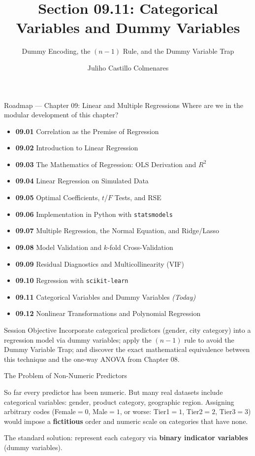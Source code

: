 \documentclass[10pt, aspectratio=169]{beamer}
\title[Categorical Variables]{Section 09.11: Categorical Variables and Dummy Variables}
\subtitle{Dummy Encoding, the $(n-1)$ Rule, and the Dummy Variable Trap}
\author[J. Castillo Colmenares]{Juliho Castillo Colmenares}
\institute{Tecnológico de Monterrey}
\date{\vspace{-1.5cm}}
\begin{document}
\begin{frame}[plain]
  \titlepage
\end{frame}

\begin{frame}{Roadmap --- Chapter 09: Linear and Multiple Regressions}
  \scriptsize
  Where are we in the modular development of this chapter?
  \begin{itemize}\itemsep=0.02em
    \item \textbf{09.01} Correlation as the Premise of Regression
    \item \textbf{09.02} Introduction to Linear Regression
    \item \textbf{09.03} The Mathematics of Regression: OLS Derivation and $R^2$
    \item \textbf{09.04} Linear Regression on Simulated Data
    \item \textbf{09.05} Optimal Coefficients, $t$/$F$ Tests, and RSE
    \item \textbf{09.06} Implementation in Python with \texttt{statsmodels}
    \item \textbf{09.07} Multiple Regression, the Normal Equation, and Ridge/Lasso
    \item \textbf{09.08} Model Validation and $k$-fold Cross-Validation
    \item \textbf{09.09} Residual Diagnostics and Multicollinearity (VIF)
    \item \textbf{09.10} Regression with \texttt{scikit-learn}
    \item \textbf{09.11} Categorical Variables and Dummy Variables \emph{(Today)}
    \item \textbf{09.12} Nonlinear Transformations and Polynomial Regression
  \end{itemize}
  \pause
  \vspace{-0.05cm}
  \begin{block}{Session Objective}
    Incorporate categorical predictors (gender, city category) into a regression model via dummy variables; apply the $(n-1)$ rule to avoid the Dummy Variable Trap; and discover the exact mathematical equivalence between this technique and the one-way ANOVA from Chapter 08.
  \end{block}
\end{frame}

\begin{frame}{The Problem of Non-Numeric Predictors}
  \footnotesize
  \begin{motivacion}
    So far every predictor has been numeric. But many real datasets include categorical variables: gender, product category, geographic region. Assigning arbitrary codes (Female$=0$, Male$=1$, or worse: Tier1$=1$, Tier2$=2$, Tier3$=3$) would impose a \textbf{fictitious} order and numeric scale on categories that have none.
  \end{motivacion}

  \vspace{0.15cm}
  \pause
  The standard solution: represent each category via \textbf{binary indicator variables} (dummy variables).
\end{frame}
\end{document}
